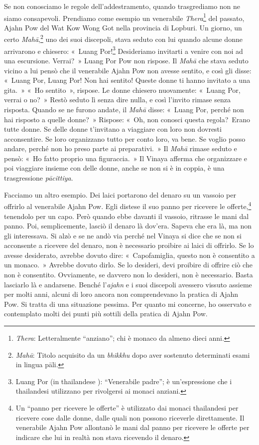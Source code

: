 Se non conosciamo le regole dell'addestramento, quando trasgrediamo non
ne siamo consapevoli. Prendiamo come esempio un venerabile
\emph{Thera}\footnote{\emph{Thera}: Letteralmente ``anziano''; chi è
  monaco da almeno dieci anni.} del passato, Ajahn Pow del Wat Kow Wong
Got nella provincia di Lopburi. Un giorno, un certo
\emph{Mahā},\footnote{\emph{Mahā}: Titolo acquisito da un \emph{bhikkhu}
  dopo aver sostenuto determinati esami in lingua pāli.} uno dei suoi
discepoli, stava seduto con lui quando alcune donne arrivarono e
chiesero: «~Luang Por!\footnote{Luang Por (in thailandese ):
  ``Venerabile padre''; è un'espressione che i thailandesi utilizzano
  per rivolgersi ai monaci anziani.} Desideriamo invitarti a venire con
noi ad una escursione. Verrai?~» Luang Por Pow non rispose. Il
\emph{Mahā} che stava seduto vicino a lui pensò che il venerabile Ajahn
Pow non avesse sentito, e così gli disse: «~Luang Por, Luang Por! Non
hai sentito! Queste donne ti hanno invitato a una gita.~» «~Ho
sentito~», rispose. Le donne chiesero nuovamente: «~Luang Por, verrai o
no?~» Restò seduto lì senza dire nulla, e così l'invito rimase senza
risposta. Quando se ne furono andate, il \emph{Mahā} disse: «~Luang Por,
perché non hai risposto a quelle donne?~» Rispose: «~Oh, non conosci
questa regola?~Erano tutte donne. Se delle donne t'invitano a viaggiare
con loro non dovresti acconsentire. Se loro organizzano tutto per conto
loro, va bene. Se voglio posso andare, perché non ho preso parte ai
preparativi.~» Il \emph{Mahā} rimase seduto e pensò: «~Ho fatto proprio
una figuraccia.~» Il Vinaya afferma che organizzare e poi viaggiare
insieme con delle donne, anche se non si è in coppia, è una
trasgressione \emph{pācittiya}.

Facciamo un altro esempio. Dei laici portarono del denaro su un vassoio
per offrirlo al venerabile Ajahn Pow. Egli distese il suo panno per
ricevere le offerte,\footnote{Un ``panno per ricevere le offerte'' è
  utilizzato dai monaci thailandesi per ricevere cose dalle donne, dalle
  quali non possono riceverle direttamente. Il venerabile Ajahn Pow
  allontanò le mani dal panno per ricevere le offerte per indicare che
  lui in realtà non stava ricevendo il denaro.} tenendolo per un capo.
Però quando ebbe davanti il vassoio, ritrasse le mani dal panno. Poi,
semplicemente, lasciò il denaro là dov'era. Sapeva che era là, ma non
gli interessava. Si alzò e se ne andò via perché nel Vinaya si dice che
se non si acconsente a ricevere del denaro, non è necessario proibire ai
laici di offrirlo. Se lo avesse desiderato, avrebbe dovuto dire:
«~Capofamiglia, questo non è consentito a un monaco.~» Avrebbe dovuto
dirlo. Se lo desideri, devi proibire di offrire ciò che non è
consentito. Ovviamente, se davvero non lo desideri, non è necessario.
Basta lasciarlo là e andarsene. Benché l'\emph{ajahn} e i suoi discepoli
avessero vissuto assieme per molti anni, alcuni di loro ancora non
comprendevano la pratica di Ajahn Pow. Si tratta di una situazione
pessima. Per quanto mi concerne, ho osservato e contemplato molti dei
punti più sottili della pratica di Ajahn Pow.

